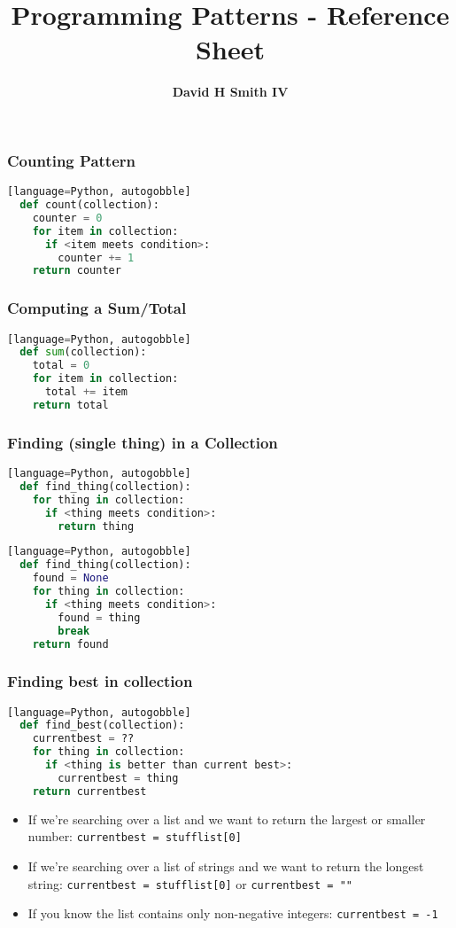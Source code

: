\documentclass{beamer}
\title{\textbf{Programming Patterns - Reference Sheet}}
\author{\textbf{David H Smith IV}}
\institute[\textbf{UIUC}]{\textbf{University of Illinois Urbana-Champaign}}
\date{\textbf{}}
\begin{document}
\frame{\titlepage}


%
%
\begin{frame}[fragile]
  \frametitle{Counting Pattern}
  \begin{lstlisting}[language=Python, autogobble][language=Python, autogobble]
  def count(collection):
    counter = 0
    for item in collection:
      if <item meets condition>:
        counter += 1
    return counter
  \end{lstlisting}
\end{frame}

%
%
\begin{frame}[fragile]
  \frametitle{Computing a Sum/Total}
  \begin{lstlisting}[language=Python, autogobble][language=Python, autogobble]
  def sum(collection):
    total = 0
    for item in collection:
      total += item
    return total
  \end{lstlisting}
\end{frame}

%
%
\begin{frame}[fragile]
  \frametitle{Finding (single thing) in a Collection}
  \begin{lstlisting}[language=Python, autogobble][language=Python, autogobble]
  def find_thing(collection):
    for thing in collection:
      if <thing meets condition>:
        return thing
  \end{lstlisting}
  \vfill
  \begin{lstlisting}[language=Python, autogobble][language=Python, autogobble]
  def find_thing(collection):
    found = None
    for thing in collection:
      if <thing meets condition>:
        found = thing
        break
    return found
  \end{lstlisting}
\end{frame}

%
%
\begin{frame}[fragile]
  \frametitle{Finding best in collection}
  \begin{lstlisting}[language=Python, autogobble][language=Python, autogobble]
  def find_best(collection):
    currentbest = ??
    for thing in collection:
      if <thing is better than current best>:
        currentbest = thing
    return currentbest 
  \end{lstlisting}
  \vfill
  \begin{itemize}
    \item If we're searching over a list and we want to return the largest or smaller number: \lstinline|currentbest = stufflist[0]| 
    \item If we're searching over a list of strings and we want to return the longest string: \lstinline|currentbest = stufflist[0]| or \lstinline|currentbest = ""|
    \item If you know the list contains only non-negative integers: \lstinline|currentbest = -1|
  \end{itemize}
\end{frame}
\end{document}
